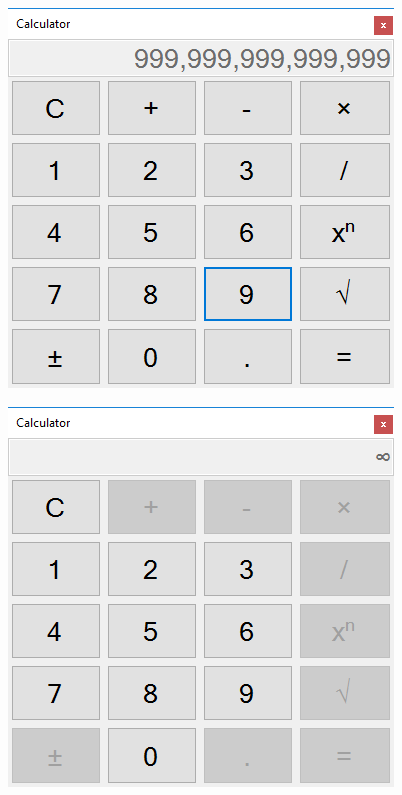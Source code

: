 \begin{figure}[ht]
 \includegraphics[scale=1]{imagini/4-max}
 \centering
\end{figure}

\begin{figure}[ht]
 \includegraphics[scale=1]{imagini/5-overflow}
 \centering
\end{figure}

